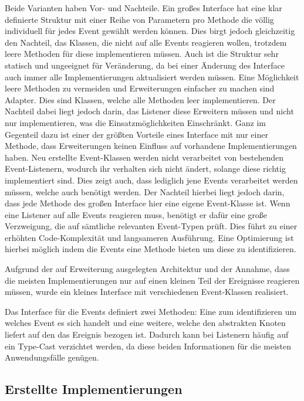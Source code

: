 Beide Varianten haben Vor- und Nachteile.
Ein großes Interface hat eine klar definierte Struktur mit einer Reihe von Parametern pro Methode die völlig individuell für jedes Event gewählt werden können. Dies birgt jedoch gleichzeitig den Nachteil, das Klassen, die nicht auf alle Events reagieren wollen, trotzdem leere Methoden für diese implementieren müssen. Auch ist die Struktur sehr statisch und ungeeignet für Veränderung, da bei einer Änderung des Interface auch immer alle Implementierungen aktualisiert werden müssen. Eine Möglichkeit leere Methoden zu vermeiden und Erweiterungen einfacher zu machen sind Adapter. Dies sind Klassen, welche alle Methoden leer implementieren. Der Nachteil dabei liegt jedoch darin, das Listener diese Erweitern müssen und nicht nur implementieren, was die Einsatzmöglichkeiten Einschränkt.
Ganz im Gegenteil dazu ist einer der größten Vorteile eines Interface mit nur einer Methode, dass Erweiterungen keinen Einfluss auf vorhandene Implementierungen haben. Neu erstellte Event-Klassen werden nicht verarbeitet von bestehenden Event-Listenern, wodurch ihr verhalten sich nicht ändert, solange diese richtig implementiert sind. Dies zeigt auch, dass lediglich jene Events verarbeitet werden müssen, welche auch benötigt werden. Der Nachteil hierbei liegt jedoch darin, dass jede Methode des großen Interface hier eine eigene Event-Klasse ist. Wenn eine Listener auf alle Events reagieren muss, benötigt er dafür eine große Verzweigung, die auf sämtliche relevanten Event-Typen prüft. Dies führt zu einer erhöhten Code-Komplexität und langsameren Ausführung. Eine Optimierung ist hierbei möglich indem die Events eine Methode bieten um diese zu identifizieren.

Aufgrund der auf Erweiterung ausgelegten Architektur und der Annahme, dass die meisten Implementierungen nur auf einen kleinen Teil der Ereignisse reagieren müssen, wurde ein kleines Interface mit verschiedenen Event-Klassen realisiert.

Das Interface für die Events  definiert zwei Methoden: Eine zum identifizieren um welches Event es sich handelt und eine weitere, welche den abstrakten Knoten liefert auf den das Ereignis bezogen ist. Dadurch kann bei Listenern häufig auf ein Type-Cast verzichtet werden, da diese beiden Informationen für die meisten Anwendungsfälle genügen.

\subsection{Erstellte Implementierungen} 


